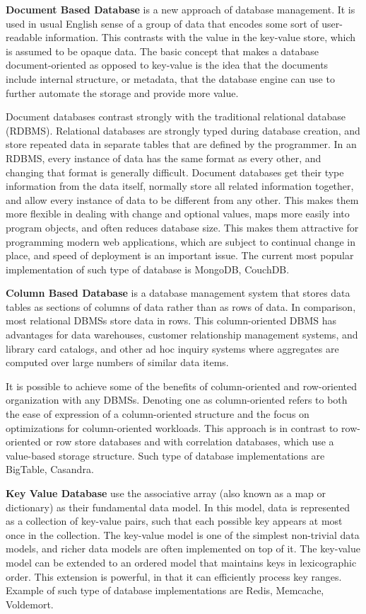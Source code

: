 \textbf{Document Based Database} is a new approach of database management. It is used in usual English sense of a group of data that encodes some sort of user-readable information. This contrasts with the value in the key-value store, which is assumed to be opaque data. The basic concept that makes a database document-oriented as opposed to key-value is the idea that the documents include internal structure, or metadata, that the database engine can use to further automate the storage and provide more value.

Document databases contrast strongly with the traditional relational database (RDBMS). Relational databases are strongly typed during database creation, and store repeated data in separate tables that are defined by the programmer. In an RDBMS, every instance of data has the same format as every other, and changing that format is generally difficult. Document databases get their type information from the data itself, normally store all related information together, and allow every instance of data to be different from any other. This makes them more flexible in dealing with change and optional values, maps more easily into program objects, and often reduces database size. This makes them attractive for programming modern web applications, which are subject to continual change in place, and speed of deployment is an important issue. The current most popular implementation of such type of database is MongoDB, CouchDB.

\textbf{Column Based Database} is a database management system that stores data tables as sections of columns of data rather than as rows of data. In comparison, most relational DBMSs store data in rows. This column-oriented DBMS has advantages for data warehouses, customer relationship management systems, and library card catalogs, and other ad hoc inquiry systems where aggregates are computed over large numbers of similar data items.

It is possible to achieve some of the benefits of column-oriented and row-oriented organization with any DBMSs. Denoting one as column-oriented refers to both the ease of expression of a column-oriented structure and the focus on optimizations for column-oriented workloads. This approach is in contrast to row-oriented or row store databases and with correlation databases, which use a value-based storage structure. Such type of database implementations are BigTable, Casandra.

\textbf{Key Value Database} use the associative array (also known as a map or dictionary) as their fundamental data model. In this model, data is represented as a collection of key-value pairs, such that each possible key appears at most once in the collection. The key-value model is one of the simplest non-trivial data models, and richer data models are often implemented on top of it. The key-value model can be extended to an ordered model that maintains keys in lexicographic order. This extension is powerful, in that it can efficiently process key ranges. Example of such type of database implementations are Redis, Memcache, Voldemort.

